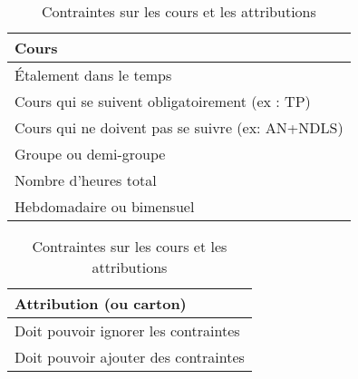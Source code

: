 \begin{table}[h!]
\begin{minipage}[t]{.3\linewidth}
\begin{tabular}{|l|}
\hline 
\textbf{Cours}\\
\hline
\hline
Étalement dans le temps\\
\hline
Cours qui se suivent obligatoirement (ex : TP)\\
\hline
Cours qui ne doivent pas se suivre (ex: AN+NDLS)\\
\hline
Groupe ou demi-groupe\\
\hline
Nombre d'heures total\\
\hline
Hebdomadaire ou bimensuel\\
\hline
\end{tabular}
\end{minipage}
\hfill
\begin{minipage}[t]{.4\linewidth}
\begin{tabular}{|l|}
\hline 
\textbf{Attribution (ou carton)}\\
\hline
\hline
Doit pouvoir ignorer les contraintes\\
\hline
Doit pouvoir ajouter des contraintes\\
\hline
\end{tabular}
\end{minipage}
\caption{Contraintes sur les cours et les attributions}
\label{cours_attribution}
\end{table}

%
%

